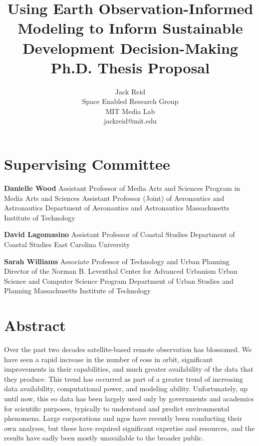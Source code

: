 \documentclass[notitlepage]{article}
\newcommand{\compr}{Danielle Wood}
\newcommand{\comte}{David Lagomasino}
\newcommand{\comco}{Sarah Williams}
\newcommand{\comprcredentials}{\newline\indent Assistant Professor of Media Arts and Sciences \newline\indent Program in Media Arts and Sciences \newline\indent Assistant Professor (Joint) of Aeronautics and Astronautics \newline\indent Department of Aeronautics and Astronautics \newline\indent Massachusetts Institute of Technology}
\newcommand{\comtecredentials}{\newline\indent Assistant Professor of Coastal Studies \newline\indent Department of Coastal Studies \newline\indent East Carolina University}
\newcommand{\comcocredentials}{\newline\indent Associate Professor of Technology and Urban Planning \newline\indent  Director of the Norman B. Leventhal Center for Advanced Urbanism \newline\indent Urban Science and Computer Science Program \newline\indent Department of Urban Studies and Planning \newline\indent Massachusetts Institute of Technology}
\begin{document}
\pretitle{\begin{center}\Huge\bfseries}
\posttitle{\par\end{center}\vskip 0.5em}
\preauthor{\begin{center}\Large\ttfamily}
\postauthor{\end{center}}
\predate{\par\large\centering}
\postdate{\par}

\title{Using Earth Observation-Informed Modeling to Inform Sustainable Development Decision-Making \\  
\large Ph.D. Thesis Proposal} 
\author{%
Jack Reid\\ 
Space Enabled Research Group\\
MIT Media Lab\\
jackreid@mit.edu}

\maketitle

\section*{Supervising Committee}


\vspace{\baselineskip}

\textbf{\compr} \comprcredentials 
 
\vspace{\baselineskip}

\textbf{\comte} \comtecredentials

\vspace{\baselineskip}

\textbf{\comco} \comcocredentials

\thispagestyle{plain}
\pagestyle{plain}

\clearpage

\section*{Abstract}


Over the past two decades satellite-based remote observation has blossomed. We have seen a rapid increase in the number of \acp{eos} in orbit, significant improvements in their capabilities, and much greater availability of the data that they produce. This trend has occurred as part of a greater trend of increasing data availability, computational power, and modeling ability. Unfortunately, up until now, this \ac{eo} data has been largely used only by governments and academics for scientific purposes, typically to understand and predict environmental phenomena. Large corporations and \acp{ngo} have recently been conducting their own analyses, but these have required significant expertise and resources, and the results have sadly been mostly unavailable to the broader public. 
\end{document}
